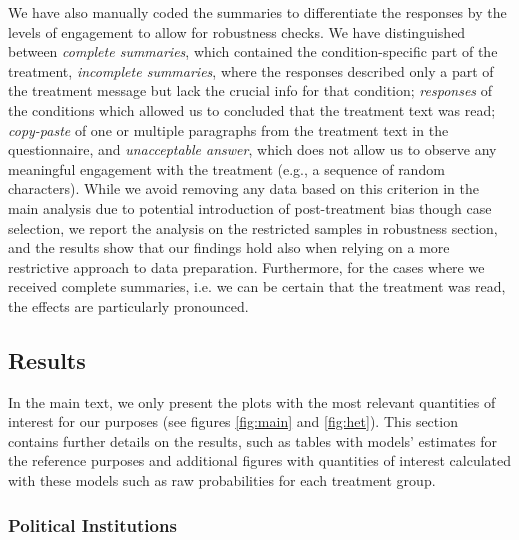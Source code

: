 \documentclass[11pt, ngerman,english,a4]{article}
\begin{document}





\clearpage

We have also manually coded the summaries to differentiate the responses by the levels of engagement to allow for robustness checks. We have distinguished between \textit{complete summaries}, which contained the condition-specific part of the treatment, \textit{incomplete summaries}, where the responses described only a part of the treatment message but lack the crucial info for that condition;  \textit{responses} of the conditions which allowed us to concluded that the treatment text was read; \textit{copy-paste} of one or multiple paragraphs from the treatment text in the questionnaire, and \textit{unacceptable answer}, which does not allow us to observe any meaningful engagement with the treatment (e.g., a sequence of random characters). While we avoid removing any data based on this criterion in the main analysis due to potential introduction of post-treatment bias though case selection, we report the analysis on the restricted samples in robustness section, and the results show that our findings hold also when relying on a more restrictive approach to data preparation. Furthermore, for the cases where we received complete summaries, i.e. we can be certain that the treatment was read, the effects are particularly pronounced. 




\newpage
\subsection{Results}


In the main text, we only present the plots with the most relevant quantities of interest for our purposes (see figures \ref{fig:main} and \ref{fig:het}). This section contains further details on the results, such as tables with models' estimates for the reference purposes and additional figures with quantities of interest calculated with these models such as raw probabilities for each treatment group. 

\subsubsection*{Political Institutions}
\end{document}
